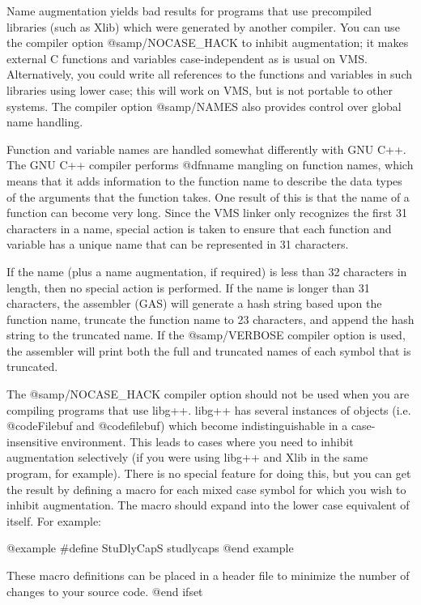 Name augmentation yields bad results for programs that use precompiled
libraries (such as Xlib) which were generated by another compiler.  You
can use the compiler option @samp{/NOCASE_HACK} to inhibit augmentation;
it makes external C functions and variables case-independent as is usual
on VMS.  Alternatively, you could write all references to the functions
and variables in such libraries using lower case; this will work on VMS,
but is not portable to other systems.  The compiler option @samp{/NAMES}
also provides control over global name handling.

Function and variable names are handled somewhat differently with GNU
C++.  The GNU C++ compiler performs @dfn{name mangling} on function
names, which means that it adds information to the function name to
describe the data types of the arguments that the function takes.  One
result of this is that the name of a function can become very long.
Since the VMS linker only recognizes the first 31 characters in a name,
special action is taken to ensure that each function and variable has a
unique name that can be represented in 31 characters.

If the name (plus a name augmentation, if required) is less than 32
characters in length, then no special action is performed.  If the name
is longer than 31 characters, the assembler (GAS) will generate a
hash string based upon the function name, truncate the function name to
23 characters, and append the hash string to the truncated name.  If the
@samp{/VERBOSE} compiler option is used, the assembler will print both
the full and truncated names of each symbol that is truncated.

The @samp{/NOCASE_HACK} compiler option should not be used when you are
compiling programs that use libg++.  libg++ has several instances of
objects (i.e.  @code{Filebuf} and @code{filebuf}) which become
indistinguishable in a case-insensitive environment.  This leads to
cases where you need to inhibit augmentation selectively (if you were
using libg++ and Xlib in the same program, for example).  There is no
special feature for doing this, but you can get the result by defining a
macro for each mixed case symbol for which you wish to inhibit
augmentation.  The macro should expand into the lower case equivalent of
itself.  For example:

@example
#define StuDlyCapS studlycaps
@end example

These macro definitions can be placed in a header file to minimize the
number of changes to your source code.
@end ifset


